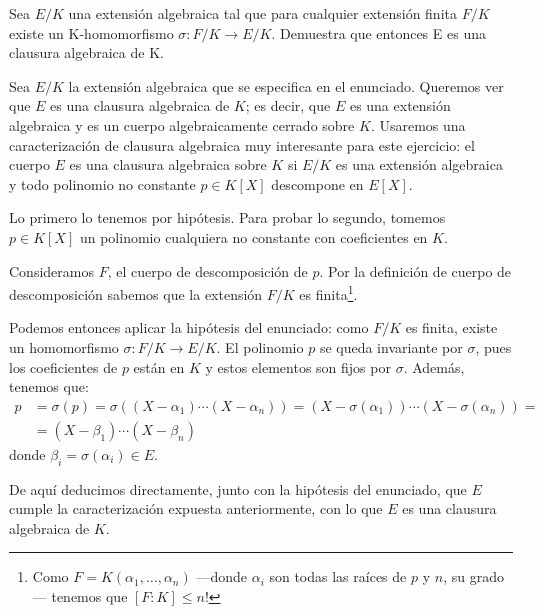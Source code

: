\documentclass[a4paper, 11pt]{article}
\begin{document}
  \maketitle

  \begin{ejercicio}
      Sea $E/K$ una extensión algebraica tal que para cualquier extensión finita $F/K$ existe un K-homomorfismo $\sigma:F/K\to E/K$. Demuestra  que entonces E es una clausura algebraica de K.
  \end{ejercicio}

  \begin{solucion}
      Sea $E/K$ la extensión algebraica que se especifica en el enunciado. Queremos ver que $E$ es una clausura algebraica de $K$; es decir, que $E$ es una extensión algebraica y es un cuerpo algebraicamente cerrado sobre $K$. Usaremos una caracterización de clausura algebraica muy interesante para este ejercicio: el cuerpo $E$ es una clausura algebraica sobre $K$ si $E/K$ es una extensión algebraica y todo polinomio no constante $p\in K[X]$ descompone en $E[X]$.

      Lo primero lo tenemos por hipótesis. Para probar lo segundo, tomemos $p\in K[X]$ un polinomio cualquiera no constante con coeficientes en $K$.

      Consideramos $F$, el cuerpo de descomposición de $p$. Por la definición de cuerpo de descomposición sabemos que la extensión $F/K$ es finita\footnote{Como $F=K(\alpha_1,\dots,\alpha_n)$ ---donde $\alpha_i$ son todas las raíces de $p$ y $n$, su grado--- tenemos que $[F:K]\leq n!$}.

      Podemos entonces aplicar la hipótesis del enunciado: como $F/K$ es finita, existe un homomorfismo $\sigma : F/K \to E/K$. El polinomio $p$ se queda invariante por $\sigma$, pues los coeficientes de $p$ están en $K$ y estos elementos son fijos por $\sigma$. Además, tenemos que:
      \begin{align*}
          p &= \sigma(p) = \sigma\left((X-\alpha_1)\cdots(X-\alpha_n)\right) = (X-\sigma(\alpha_1))\cdots(X-\sigma(\alpha_n)) = \\
          &= (X-\beta_1)\cdots(X-\beta_n)
      \end{align*}
      donde $\beta_i = \sigma(\alpha_i) \in E$.

      De aquí deducimos directamente, junto con la hipótesis del enunciado, que $E$ cumple la caracterización expuesta anteriormente, con lo que $E$ es una clausura algebraica de $K$.
  \end{solucion}
\end{document}
